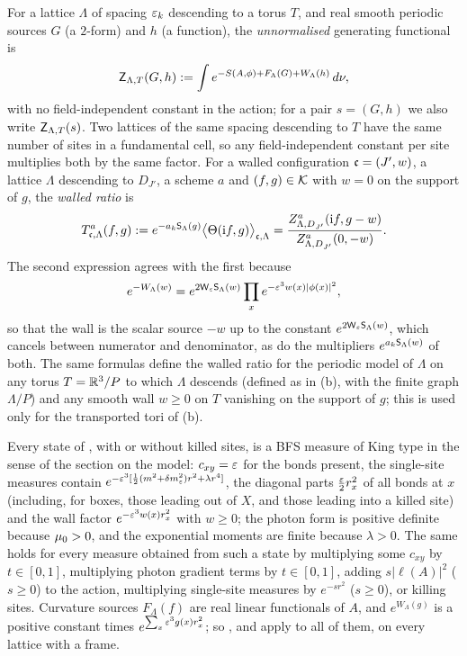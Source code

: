 \begin{definition}\label{rot:def:Zun}
For a lattice $\Lambda$ of spacing $\varepsilon_k$ descending to a torus $T$, and real smooth periodic sources $G$ (a $2$-form) and $h$ (a function), the \emph{unnormalised} generating functional is
\[
\mathsf Z_{\Lambda,T}(G,h):=\int e^{-S(A,\phi)+F_\Lambda(G)+W_\Lambda(h)}\,d\nu ,
\]
with no field-independent constant in the action; for a pair $s=(G,h)$ we also write $\mathsf Z_{\Lambda,T}(s)$. Two lattices of the same spacing descending to $T$ have the same number of sites in a fundamental cell, so any field-independent constant per site multiplies both by the same factor. For a walled configuration $\mathfrak c=(J',w)$, a lattice $\Lambda$ descending to $D_{J'}$, a scheme $a$ and $(f,g)\in\mathcal K$ with $w=0$ on the support of $g$, the \emph{walled ratio} is
\[
T^{a}_{\mathfrak c,\Lambda}(f,g):= e^{-a_k\mathsf S_\Lambda(g)}\big\langle\Theta(\mathrm if,g)\big\rangle_{\mathfrak c,\Lambda}
=\frac{Z^a_{\Lambda,D_{J'}}(\mathrm if,g-w)}{Z^a_{\Lambda,D_{J'}}(0,-w)} .
\]
The second expression agrees with the first because
\[
e^{-W_\Lambda(w)}=e^{2\mathsf W_{\varepsilon}\mathsf S_\Lambda(w)}\prod_xe^{-\varepsilon^3w(x)|\phi(x)|^2},
\]
so that the wall is the scalar source $-w$ up to the constant $e^{2\mathsf W_{\varepsilon}\mathsf S_\Lambda(w)}$, which cancels between numerator and denominator, as do the multipliers $e^{a_k\mathsf S_\Lambda(w)}$ of both. The same formulas define the walled ratio for the periodic model of $\Lambda$ on any torus $T=\mathbb R^3/P$ to which $\Lambda$ descends (defined as in (b), with the finite graph $\Lambda/P$) and any smooth wall $w\ge0$ on $T$ vanishing on the support of $g$; this is used only for the transported tori of (b).
\end{definition}

Every state of , with or without killed sites, is a BFS measure of King type in the sense of the section on the model: $c_{xy}=\varepsilon$ for the bonds present, the single-site measures contain $e^{-\varepsilon^3[\frac12(m^2+\delta m^2_{\varepsilon})r^2+\lambda r^4]}$, the diagonal parts $\frac{\varepsilon}2r_x^2$ of all bonds at $x$ (including, for boxes, those leading out of $X$, and those leading into a killed site) and the wall factor $e^{-\varepsilon^3w(x)r_x^2}$ with $w\ge0$; the photon form is positive definite because $\mu_0>0$, and the exponential moments are finite because $\lambda>0$. The same holds for every measure obtained from such a state by multiplying some $c_{xy}$ by $t\in[0,1]$, multiplying photon gradient terms by $t\in[0,1]$, adding $s|\ell(A)|^2$ ($s\ge0$) to the action, multiplying single-site measures by $e^{-sr^2}$ ($s\ge0$), or killing sites. Curvature sources $F_\Lambda(f)$ are real linear functionals of $A$, and $e^{W_\Lambda(g)}$ is a positive constant times $e^{\sum_x\varepsilon^3g(x)r_x^2}$; so ,  and  apply to all of them, on every lattice with a frame.

